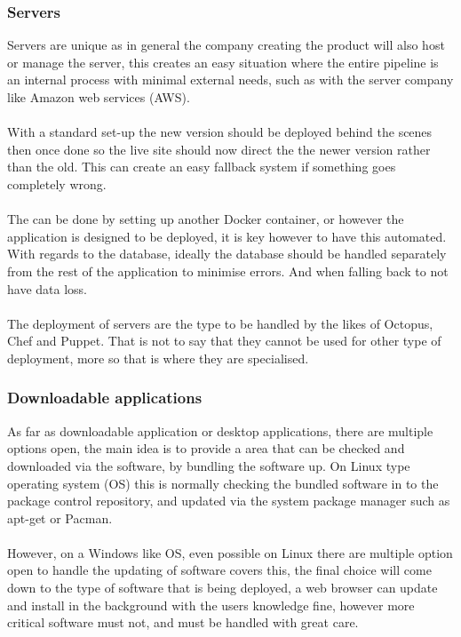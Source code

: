 \subsubsection{Servers}

Servers are unique as in general the company creating the product will also host or manage the server, this creates an easy situation where the entire pipeline is an internal process with minimal external needs, such as with the server company like Amazon web services (AWS).
\\\\
With a standard set-up the new version should be deployed behind the scenes then once done so the live site should now direct the the newer version rather than the old. This can create an easy fallback system if something goes completely wrong.
\\\\
The can be done by setting up another Docker container, or however the application is designed to be deployed, it is key however to have this automated. With regards to the database, ideally the database should be handled separately from the rest of the application to minimise errors. And when falling back to not have data loss.
\\\\
The deployment of servers are the type to be handled by the likes of Octopus, Chef and Puppet. That is not to say that they cannot be used for other type of deployment, more so that is where they are specialised.

\subsubsection{Downloadable applications}

As far as downloadable application or desktop applications, there are multiple options open, the main idea is to provide a area that can be checked and downloaded via the software, by bundling the software up. On Linux type operating system (OS) this is normally checking the bundled software in to the package control repository, and updated via the system package manager such as apt-get or Pacman. 
\\\\
However, on a Windows like OS, even possible on Linux there are multiple option open to handle the updating of software \cite{deploy} covers this, the final choice will come down to the type of software that is being deployed, a web browser can update and install in the background with the users knowledge fine, however more critical software must not, and must be handled with great care.

